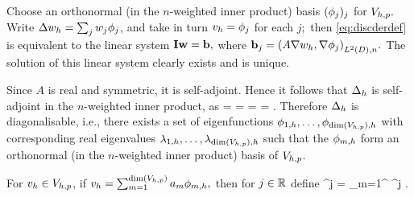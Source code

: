 Choose an orthonormal (in the $n$-weighted inner product) basis  $(\phi_{j})_j$ for $V_{h,p}.$ Write $\Delta w_{h} = \sum_j w_{j} \phi_{j}$, and take in turn $v_{h} = \phi_{j}$ for each $j;$ then \cref{eq:discderdef} is equivalent to the linear system $\mathbf{I} \mathbf{w} = \mathbf{b},$ where $\bb_{j} = \IPLtDn{A \grad \wh}{\grad \phij}.$ The solution of this linear system clearly exists and is unique.
\epf


Since $A$ is real and symmetric, it is self-adjoint. Hence it follows that $\Delta_{h}$ is self-adjoint in the $n$-weighted inner product, as
\beqs
\IPLtDn{\Deltah \wh}{\vh} =  =  = \overline{\IPLtDn{\Deltah \vh}{\wh}} = \IPLtDn{\wh}{\Deltah \vh}.
\eeqs
Therefore $\Delta_{h}$ is diagonalisable, i.e., there exists a set of eigenfunctions $\phioh,\ldots,\phidimVhph$  with corresponding real eigenvalues $\lambdaoh, \ldots, \lambdadimVhph$ such that the $\phi_{m,h}$ form an orthonormal (in the $n$-weighted inner product) basis of $V_{h,p}$.

\label{def:hodd}
For $v_{h} \in V_{h,p}$, if $\vh = \sum_{m=1}^{\dimVhp} \am \phimh,$ then for $j \in \mathbb R$ define
\beqs
\Deltah^j \vh = \sum_{m=1}^{\dimVhp} \lambdamh^j \am \phimh.
\eeqs


